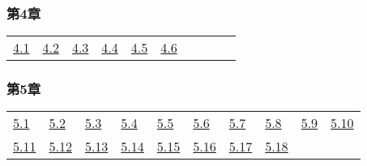 \subsubsection*{第4章} 

\begin{tabular}{llllllllll}
\hyperref[図4.1]{4.1} &
\hyperref[図4.2]{4.2} &
\hyperref[図4.3]{4.3} &
\hyperref[図4.4]{4.4} &
\hyperref[図4.5]{4.5} &
\hyperref[図4.6]{4.6} &
\end{tabular} 

\subsubsection*{第5章} 

\begin{tabular}{llllllllll}
\hyperref[図5.1]{5.1} &
\hyperref[図5.2]{5.2} &
\hyperref[図5.3]{5.3} &
\hyperref[図5.4]{5.4} &
\hyperref[図5.5]{5.5} &
\hyperref[図5.6]{5.6} &
\hyperref[図5.7]{5.7} &
\hyperref[図5.8]{5.8} &
\hyperref[図5.9]{5.9} &
\hyperref[図5.10]{5.10}
\\ 
\hyperref[図5.11]{5.11} &
\hyperref[図5.12]{5.12} &
\hyperref[図5.13]{5.13} &
\hyperref[図5.14]{5.14} &
\hyperref[図5.15]{5.15} &
\hyperref[図5.16]{5.16} &
\hyperref[図5.17]{5.17} &
\hyperref[図5.18]{5.18} &
\end{tabular} 

